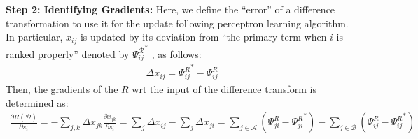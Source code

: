 \documentclass{article}
\begin{document}
{\textbf{Step 2: Identifying Gradients:} Here, we define the ``error'' of a difference transformation to use it for the update following perceptron learning algorithm. In particular, $x_{ij}$ is updated by its deviation from ``the primary term when $i$ is ranked properly'' denoted by ${\Psi^\mathcal{R}_{ij}}^*$ , as follows:
\begin{align}
    \Delta x_{ij} = {\Psi^R_{ij}}^* - \Psi^R_{ij}
\end{align}
Then, the gradients of the $R$ wrt the input of the difference transform is determined as: 
\begin{align}
    \label{eq:GeneralizedGradients}
    \frac{\partial R(\mathcal{D})}{\partial s_i} 
    = -\sum \limits_{j,k} \Delta x_{jk} \frac{\partial x_{jk}}{\partial s_i} 
    = \sum \limits_{j} \Delta x_{ij} - \sum \limits_{j} \Delta x_{ji}  
    = \sum \limits_{j \in \mathcal{A}} \left( {\Psi^R_{ji} - \Psi^R_{ji}}^*  \right) - \sum \limits_{j \in \mathcal{B}}  \left( { \Psi^R_{ij} - \Psi^R_{ij}}^*\right)
\end{align}

}
\end{document}
